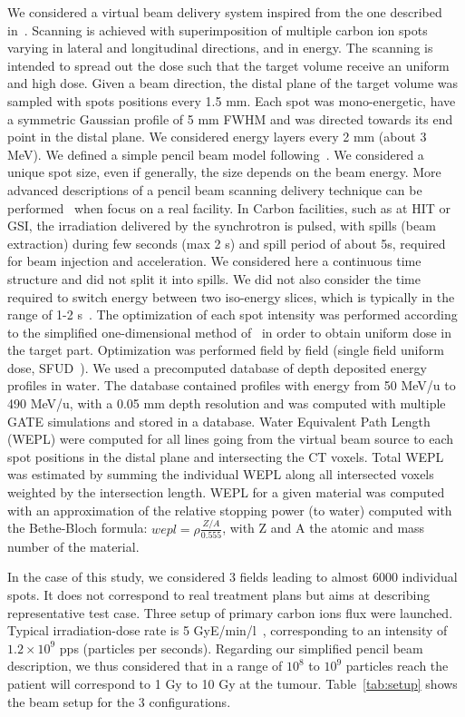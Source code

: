 \documentclass[11pt]{iopart}
\begin{document}
We considered a virtual beam delivery system inspired from the one
described in~\cite{Kramer2000a}. Scanning is achieved with
superimposition of multiple carbon ion spots varying in lateral and
longitudinal directions, and in energy. The scanning is intended to
spread out the dose such that the target volume receive an uniform and
high dose.  Given a beam direction, the distal plane of the target
volume was sampled with spots positions every 1.5 mm. Each spot was
mono-energetic, have a symmetric Gaussian profile of 5 mm FWHM and was
directed towards its end point in the distal plane. We considered
energy layers every 2 mm (about 3 MeV). We defined a simple pencil
beam model following~\cite{Grevillot2010}. We considered a unique spot
size, even if generally, the size depends on the beam energy. More
advanced descriptions of a pencil beam scanning delivery technique can
be performed~\cite{Grevillot2011} when focus on a real facility. In
Carbon facilities, such as at HIT or GSI, the irradiation delivered by
the synchrotron is pulsed, with spills (beam extraction) during few
seconds (max 2 s) and spill period of about 5s, required for beam
injection and acceleration. We considered here a continuous time
structure and did not split it into spills. We did not also consider
the time required to switch energy between two iso-energy slices,
which is typically in the range of 1-2 s~\cite{Rietzel2010}. The
optimization of each spot intensity was performed according to the
simplified one-dimensional method of~\cite{Kramer2000a} in order to
obtain uniform dose in the target part. Optimization was performed
field by field (single field uniform dose, SFUD~\cite{Lomax1999}). We
used a precomputed database of depth deposited energy profiles in
water. The database contained profiles with energy from 50 MeV/u to
490 MeV/u, with a 0.05 mm depth resolution and was computed with
multiple GATE simulations and stored in a database. Water Equivalent
Path Length (WEPL) were computed for all lines going from the virtual
beam source to each spot positions in the distal plane and
intersecting the CT voxels. Total WEPL was estimated by summing the
individual WEPL along all intersected voxels weighted by the
intersection length. WEPL for a given material was computed with an
approximation of the relative stopping power (to water) computed with
the Bethe-Bloch formula: $wepl = \rho \frac{Z/A}{0.555}$, with Z and A
the atomic and mass number of the material.

In the case of this study, we considered 3 fields leading to almost
6000 individual spots. It does not correspond to real treatment plans
but aims at describing representative test case. Three setup of
primary carbon ions flux were launched. Typical irradiation-dose rate
is 5 GyE/min/l~\cite{Noda2007}, corresponding to an intensity of
$1.2\times 10^9$ pps (particles per seconds). Regarding our simplified
pencil beam description, we thus considered that in a range of $10^8$
to $10^9$ particles reach the patient will correspond to 1 Gy to 10 Gy
at the tumour. Table~\ref{tab:setup} shows the beam setup for the 3
configurations.
\end{document}
